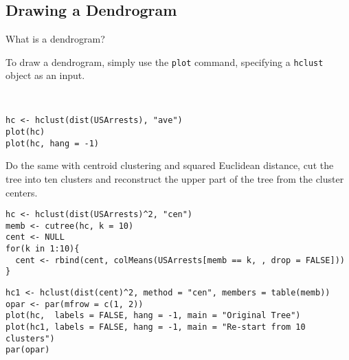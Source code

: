 \documentclass[11pt]{article} %
\begin{document}
\newpage
\subsection{Drawing a Dendrogram}


What is a dendrogram?



To draw a dendrogram, simply use the \texttt{plot} command, specifying a \texttt{hclust} object as an input.
\begin{framed}
\begin{verbatim}


hc <- hclust(dist(USArrests), "ave")
plot(hc)
plot(hc, hang = -1)

\end{verbatim}
\end{framed}



Do the same with centroid clustering and squared Euclidean distance, cut the tree into ten clusters and reconstruct the upper part of the tree from the cluster centers.
\begin{framed}
\begin{verbatim}
hc <- hclust(dist(USArrests)^2, "cen")
memb <- cutree(hc, k = 10)
cent <- NULL
for(k in 1:10){
  cent <- rbind(cent, colMeans(USArrests[memb == k, , drop = FALSE]))
}
\end{verbatim}
\end{framed}

\begin{framed}
\begin{verbatim}
hc1 <- hclust(dist(cent)^2, method = "cen", members = table(memb))
opar <- par(mfrow = c(1, 2))
plot(hc,  labels = FALSE, hang = -1, main = "Original Tree")
plot(hc1, labels = FALSE, hang = -1, main = "Re-start from 10 clusters")
par(opar)


\end{verbatim}
\end{framed}
\end{document}
